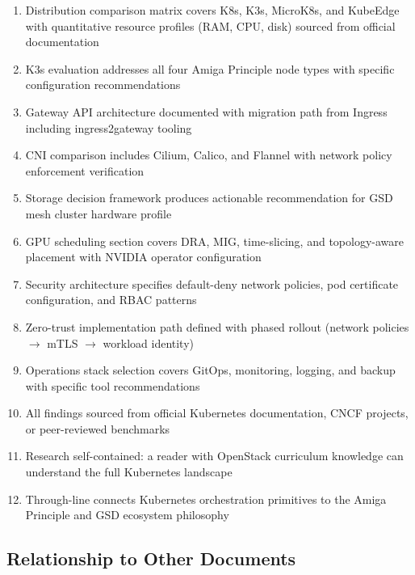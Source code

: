 \documentclass[11pt,letterpaper]{article}
\begin{document}
\begin{enumerate}[leftmargin=2em]
\item Distribution comparison matrix covers K8s, K3s, MicroK8s, and KubeEdge with quantitative resource profiles (RAM, CPU, disk) sourced from official documentation
\item K3s evaluation addresses all four Amiga Principle node types with specific configuration recommendations
\item Gateway API architecture documented with migration path from Ingress including ingress2gateway tooling
\item CNI comparison includes Cilium, Calico, and Flannel with network policy enforcement verification
\item Storage decision framework produces actionable recommendation for GSD mesh cluster hardware profile
\item GPU scheduling section covers DRA, MIG, time-slicing, and topology-aware placement with NVIDIA operator configuration
\item Security architecture specifies default-deny network policies, pod certificate configuration, and RBAC patterns
\item Zero-trust implementation path defined with phased rollout (network policies $\rightarrow$ mTLS $\rightarrow$ workload identity)
\item Operations stack selection covers GitOps, monitoring, logging, and backup with specific tool recommendations
\item All findings sourced from official Kubernetes documentation, CNCF projects, or peer-reviewed benchmarks
\item Research self-contained: a reader with OpenStack curriculum knowledge can understand the full Kubernetes landscape
\item Through-line connects Kubernetes orchestration primitives to the Amiga Principle and GSD ecosystem philosophy
\end{enumerate}

\subsection{Relationship to Other Documents}
\end{document}
